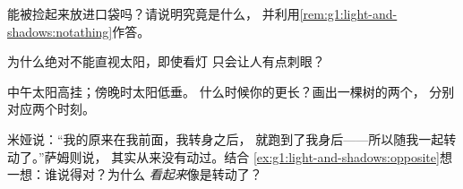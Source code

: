 \begin{exercise}[$\star$]\label{exo:g1:light-and-shadows:6}
能被捡起来放进口袋吗？请说明究竟是什么，
并利用\cref{rem:g1:light-and-shadows:notathing}作答。
\end{exercise}

\begin{exercise}[$\star$]\label{exo:g1:light-and-shadows:7}
为什么绝对不能直视太阳，即使看灯
只会让人有点刺眼？
\end{exercise}

\begin{exercise}[$\star$]\label{exo:g1:light-and-shadows:8}
中午太阳高挂；傍晚时太阳低垂。
什么时候你的更长？画出一棵树的两个，
分别对应两个时刻。
\end{exercise}

\begin{exercise}[$\star\star$]\label{exo:g1:light-and-shadows:9}
米娅说：“我的原来在我前面，我转身之后，
就跑到了我身后——所以随我一起转动了。”萨姆则说，
其实从来没有动过。结合
\cref{ex:g1:light-and-shadows:opposite}想一想：谁说得对？为什么
\emph{看起来}像是转动了？
\end{exercise}
